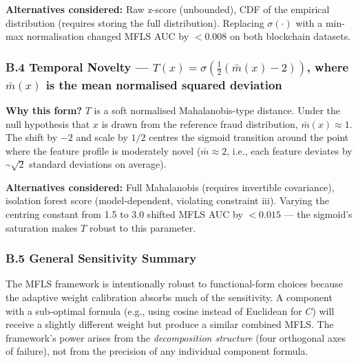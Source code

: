 \documentclass[
  11pt,
]{article}
\begin{document}
\textbf{Alternatives considered:} Raw z-score (unbounded), CDF of the
empirical distribution (requires storing the full distribution).
Replacing \(\sigma(\cdot)\) with a min-max normalisation changed MFLS
AUC by \(< 0.008\) on both blockchain datasets.

\subsubsection{\texorpdfstring{B.4 Temporal Novelty —
\(T(x) = \sigma\!\left(\frac{1}{2}(\bar{m}(x) - 2)\right)\), where
\(\bar{m}(x)\) is the mean normalised squared
deviation}{B.4 Temporal Novelty — T(x) = \textbackslash sigma\textbackslash!\textbackslash left(\textbackslash frac\{1\}\{2\}(\textbackslash bar\{m\}(x) - 2)\textbackslash right), where \textbackslash bar\{m\}(x) is the mean normalised squared deviation}}\label{b.4-temporal-novelty-tx-sigmaleftfrac12barmx---2right-where-barmx-is-the-mean-normalised-squared-deviation}

\textbf{Why this form?} \(T\) is a soft normalised Mahalanobis-type
distance. Under the null hypothesis that \(x\) is drawn from the
reference fraud distribution, \(\bar{m}(x) \approx 1\). The shift by
\(-2\) and scale by \(1/2\) centres the sigmoid transition around the
point where the feature profile is moderately novel
(\(\bar{m} \approx 2\), i.e., each feature deviates by
\textasciitilde{}\(\sqrt{2}\) standard deviations on average).

\textbf{Alternatives considered:} Full Mahalanobis (requires invertible
covariance), isolation forest score (model-dependent, violating
constraint iii). Varying the centring constant from 1.5 to 3.0 shifted
MFLS AUC by \(< 0.015\) — the sigmoid’s saturation makes \(T\) robust to
this parameter.

\subsubsection{B.5 General Sensitivity
Summary}\label{b.5-general-sensitivity-summary}

The MFLS framework is intentionally robust to functional-form choices
because the adaptive weight calibration absorbs much of the sensitivity.
A component with a sub-optimal formula (e.g., using cosine instead of
Euclidean for \(C\)) will receive a slightly different weight but
produce a similar combined MFLS. The framework’s power arises from the
\emph{decomposition structure} (four orthogonal axes of failure), not
from the precision of any individual component formula.
\end{document}
